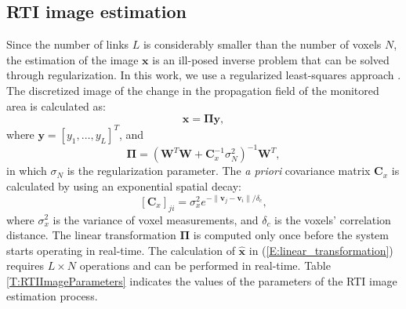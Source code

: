 \documentclass[conference]{IEEEtran}
\begin{document}
\subsection{RTI image estimation} \label{sec:RTI_image_est} Since the
number of links $L$ is considerably smaller than the number of voxels
$N$, the estimation of the image $\mathbf{x}$ is an ill-posed inverse
problem that can be solved through regularization. In this work, we
use a regularized least-squares approach
\cite{Patwari_corr_shadow_2008,Zhao_SECON_2011,MASS,Grandma_2012}. The
discretized image of the change in the propagation field of the
monitored area is calculated as:
\begin{equation}\label{E:linear_transformation}
\hat{\mathbf{x}} =  \mathbf{\Pi}\mathbf{y},
\end{equation}
where $\mathbf{y}= [ y_1, \ldots, y_L]^T$, and
\begin{equation}\label{E:tikhonov}
{\mathbf{\Pi}} = {(\mathbf{W}^T\mathbf{W}+\mathbf{C}_{x}^{-1}\sigma_{N}^{2})}^{-1}\mathbf{W}^T,
\end{equation}
in which $\sigma_{N}$ is the regularization parameter. The \emph{a
  priori} covariance matrix $\mathbf{C}_{x}$ is calculated by using an
exponential spatial decay:
\begin{equation}\label{E:cov_matrix}
[\mathbf{C}_{x}]_{ji}=\sigma_{x}^{2}e^{-\| \mathbf{v}_{j}-\mathbf{v}_{i} \| /\delta_{c}},
\end{equation}
where $\sigma_{x}^{2}$ is the variance of voxel measurements, and
$\delta_{c}$ is the voxels' correlation distance. The linear
transformation $\mathbf{\Pi}$ is computed only once before the system
starts operating in real-time. The calculation of $\hat{\mathbf{x}}$
in (\ref{E:linear_transformation}) requires $L \times N$ operations
and can be performed in real-time. Table \ref{T:RTIImageParameters}
indicates the values of the parameters of the RTI image estimation
process.
\end{document}
